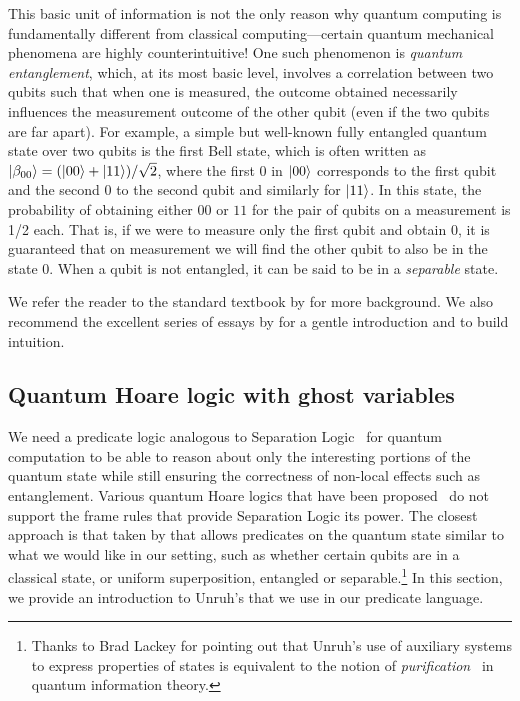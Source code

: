 This basic unit of information is not the only reason why quantum computing is fundamentally different from classical computing---certain quantum mechanical phenomena are highly counterintuitive! One such phenomenon is \textit{quantum entanglement}, which, at its most basic level, involves a correlation between two qubits such that when one is measured, the outcome obtained necessarily influences the measurement outcome of the other qubit (even if the two qubits are far apart). For example, a simple but well-known fully entangled quantum state over two qubits is the first Bell state, which is often written as $\ket{\beta_{00}} = (\ket{00}+\ket{11})/\sqrt{2}$, where the first $0$ in $\ket{00}$ corresponds to the first qubit and the second $0$ to the second qubit and similarly for $\ket{11}$. In this state, the probability of obtaining either $00$ or $11$ for the pair of qubits on a measurement is 1/2 each. That is, if we were to measure only the first qubit and obtain $0$, it is guaranteed that on measurement we will find the other qubit to also be in the state $0$. When a qubit is not entangled, it can be said to be in a \textit{separable} state.

We refer the reader to the standard textbook by \textcite{nielsen2010} for more background. We also recommend the excellent series of essays by \textcite{matuschak2019} for a gentle introduction and to build intuition.

\subsection{Quantum Hoare logic with ghost variables}

We need a predicate logic analogous to Separation Logic~\parencite{reynolds2002} for quantum computation to be able to reason about only the interesting portions of the quantum state while still ensuring the correctness of non-local effects such as entanglement. Various quantum Hoare logics that have been proposed~\parencite{aqhl2019,floydhoare2012,wpe2016} do not support the frame rules that provide Separation Logic its power. The closest approach is that taken by \textcite{unruh2019} that allows predicates on the quantum state similar to what we would like in our setting, such as whether certain qubits are in a classical state, or uniform superposition, entangled or separable.\footnote{Thanks to Brad Lackey for pointing out that Unruh's use of auxiliary systems to express properties of states is equivalent to the notion of \textit{purification}~\parencites{Powers1970}[110]{nielsen2010} in quantum information theory.} In this section, we provide an introduction to Unruh's  that we use in our predicate language.

